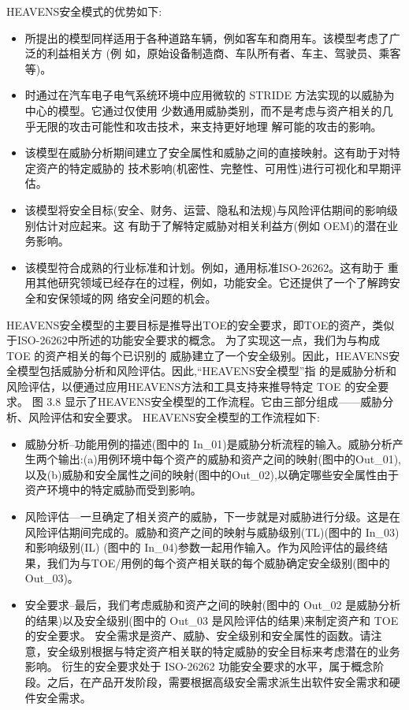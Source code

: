   HEAVENS安全模式的优势如下:

  \begin{itemize}
    \item  所提出的模型同样适用于各种道路车辆，例如客车和商用车。该模型考虑了广泛的利益相关方 (例
    如，原始设备制造商、车队所有者、车主、驾驶员、乘客等)。
    \item  时通过在汽车电子电气系统环境中应用微软的 STRIDE 方法实现的以威胁为中心的模型。它通过仅使用
    少数通用威胁类别，而不是考虑与资产相关的几乎无限的攻击可能性和攻击技术，来支持更好地理
    解可能的攻击的影响。
    \item  该模型在威胁分析期间建立了安全属性和威胁之间的直接映射。这有助于对特定资产的特定威胁的
    技术影响(机密性、完整性、可用性)进行可视化和早期评估。
    \item 该模型将安全目标(安全、财务、运营、隐私和法规)与风险评估期间的影响级别估计对应起来。这
    有助于了解特定威胁对相关利益方(例如 OEM)的潜在业务影响。
    \item 该模型符合成熟的行业标准和计划。例如，通用标准ISO-26262。这有助于
    重用其他研究领域已经存在的过程，例如，功能安全。它还提供了一个了解跨安全和安保领域的网
    络安全问题的机会。
\end{itemize}

HEAVENS安全模型的主要目标是推导出TOE的安全要求，即TOE的资产，类似于ISO-26262中所述的功能安全要求的概念。
为了实现这一点，我们为与构成 TOE 的资产相关的每个已识别的
威胁建立了一个安全级别。因此，HEAVENS安全模型包括威胁分析和风险评估。因此,“HEAVENS安全模型”指
的是威胁分析和风险评估，以便通过应用HEAVENS方法和工具支持来推导特定 TOE 的安全要求。
图 3.8 显示了HEAVENS安全模型的工作流程。它由三部分组成——威胁分析、风险评估和安全要求。
HEAVENS安全模型的工作流程如下:
\begin{itemize}
    \item  威胁分析–功能用例的描述(图中的 In\_01)是威胁分析流程的输入。威胁分析产生两个输出:(a)用例环境中每个资产的威胁和资产之间的映射(图中的Out\_01),
    以及(b)威胁和安全属性之间的映射(图中的Out\_02),以确定哪些安全属性由于资产环境中的特定威胁而受到影响。
    \item  风险评估—一旦确定了相关资产的威胁，下一步就是对威胁进行分级。这是在风险评估期间完成的。威胁和资产之间的映射与威胁级别(TL)(图中的 In\_03)和影响级别(IL)
    (图中的 In\_04)参数一起用作输入。作为风险评估的最终结果，我们为与TOE/用例的每个资产相关联的每个威胁确定安全级别(图中的 Out\_03)。
    \item  安全要求–最后，我们考虑威胁和资产之间的映射(图中的 Out\_02 是威胁分析的结果)以及安全级别(图中的 Out\_03 是风险评估的结果)来制定资产和 TOE 的安全要求。
    安全需求是资产、威胁、安全级别和安全属性的函数。请注意，安全级别根据与特定资产相关联的特定威胁的安全目标来考虑潜在的业务影响。
    衍生的安全要求处于 ISO-26262 功能安全要求的水平，属于概念阶段。之后，在产品开发阶段，需要根据高级安全需求派生出软件安全需求和硬件安全需求。
  \end{itemize}


